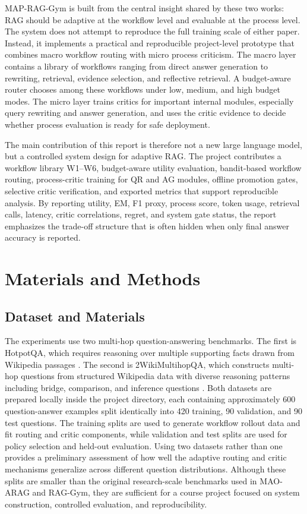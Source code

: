 \documentclass[12pt,a4paper]{article}
\begin{document}
MAP-RAG-Gym is built from the central insight shared by these two works: RAG should be adaptive at the workflow level and evaluable at the process level. The system does not attempt to reproduce the full training scale of either paper. Instead, it implements a practical and reproducible project-level prototype that combines macro workflow routing with micro process criticism. The macro layer contains a library of workflows ranging from direct answer generation to rewriting, retrieval, evidence selection, and reflective retrieval. A budget-aware router chooses among these workflows under low, medium, and high budget modes. The micro layer trains critics for important internal modules, especially query rewriting and answer generation, and uses the critic evidence to decide whether process evaluation is ready for safe deployment.

The main contribution of this report is therefore not a new large language model, but a controlled system design for adaptive RAG. The project contributes a workflow library W1--W6, budget-aware utility evaluation, bandit-based workflow routing, process-critic training for QR and AG modules, offline promotion gates, selective critic verification, and exported metrics that support reproducible analysis. By reporting utility, EM, F1 proxy, process score, token usage, retrieval calls, latency, critic correlations, regret, and system gate status, the report emphasizes the trade-off structure that is often hidden when only final answer accuracy is reported.

\section{Materials and Methods}

\subsection{Dataset and Materials}

The experiments use two multi-hop question-answering benchmarks. The first is HotpotQA, which requires reasoning over multiple supporting facts drawn from Wikipedia passages \cite{yang2018hotpotqa}. The second is 2WikiMultihopQA, which constructs multi-hop questions from structured Wikipedia data with diverse reasoning patterns including bridge, comparison, and inference questions \cite{ho2020twowiki}. Both datasets are prepared locally inside the project directory, each containing approximately 600 question-answer examples split identically into 420 training, 90 validation, and 90 test questions. The training splits are used to generate workflow rollout data and fit routing and critic components, while validation and test splits are used for policy selection and held-out evaluation. Using two datasets rather than one provides a preliminary assessment of how well the adaptive routing and critic mechanisms generalize across different question distributions. Although these splits are smaller than the original research-scale benchmarks used in MAO-ARAG and RAG-Gym, they are sufficient for a course project focused on system construction, controlled evaluation, and reproducibility.
\end{document}
